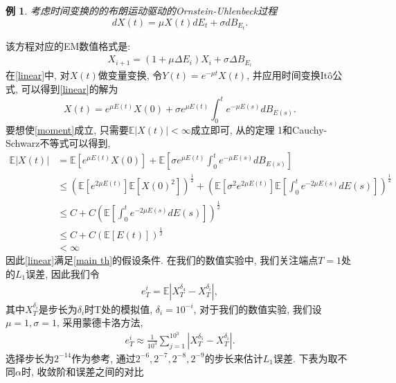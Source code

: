 \documentclass[12pt, final]{article}
\numberwithin{equation}{section}
\numberwithin{figure}{section}
\numberwithin{table}{section}
\theoremstyle{plain}
\theoremstyle{Definition}
\newtheorem{Example}[Theorem]{例}       %
\theoremstyle{Remark}
\begin{document}
	\begin{Example}
		考虑时间变换的的布朗运动驱动的Ornstein-Uhlenbeck过程
			\begin{equation}\label{linear}
			dX(t) = \mu X(t)dE_t + \sigma dB_{E_t}. 
		\end{equation}
	\end{Example}
		该方程对应的EM数值格式是:
		\begin{align*}
			X_{i+1} = (1 + \mu \Delta E_i) X_i + \sigma \Delta B_{E_i}
		\end{align*}
		在\cref{linear}中, 对$X(t)$做变量变换, 令$Y(t) = e^{-\mu t}X(t)$, 并应用时间变换It\^{o}公式, 可以得到\cref{linear}的解为
		\begin{equation}\label{linear solusion}
			X(t) = e^{\mu E(t)}X(0) + \sigma e^{\mu E(t)} \int_{0}^{t}e^{-\mu E(s)}dB_{E(s)}. 
		\end{equation}
		要想使\cref{moment}成立, 只需要$\mathbb{E}|X(t)| < \infty$成立即可, 从\cite{jin2019strong}的定理 1和Cauchy-Schwarz不等式可以得到, 
		\begin{align*}
			\mathbb{E}|X(t)| &= \mathbb{E}\left[e^{\mu E(t)}X(0)\right] + \mathbb{E}\left[\sigma e^{\mu E(t)}\int_0^t e^{-\mu E(s)}dB_{E(s)}\right]\\
			&\le \left(\mathbb{E}\left[e^{2\mu E(t)}\right]\mathbb{E}\left[X(0)^2\right]\right)^{\frac{1}{2}} + \left(\mathbb{E}\left[\sigma^2e^{2\mu E(t)}\right]\mathbb{E}\left[\int_0^te^{-2\mu E(s)}dE(s)\right]\right)^\frac{1}{2}\\
			& \le C + C\left(\mathbb{E}\left[\int_0^te^{-2\mu E(s)}dE(s)\right]\right)^{\frac{1}{2}}\\
			& \le C + C\left(\mathbb{E}[E(t)]\right)^{\frac{1}{2}}\\
			& < \infty
		\end{align*}
		因此\cref{linear}满足\cref{main th}的假设条件. 
		在我们的数值实验中, 我们关注端点$T = 1$处的$L_1$误差, 因此我们令
		\begin{align*}
			e_T^{i}=\mathbb{E}\left|X_T^{\delta _4}-X_T^{\delta _i}\right|, 
		\end{align*}
		其中$X_T^{\delta _i}$是步长为$\delta _i$时T处的模拟值, $\delta _i = 10^{-i}$, 对于我们的数值实验, 我们设$\mu=1, \sigma=1$, 采用蒙德卡洛方法, 
		\begin{align*}
			e_{T}^i\approx\frac{1}{10^3}\sum_{j=1}^{10^3}\left|X_T^{\delta _5}-X_T^{\delta _i}\right|. 
		\end{align*}
		选择步长为$2^{-14}$作为参考, 通过${2^{-6}, 2^{-7}, 2^{-8}, 2^{-9}}$的步长来估计$L_1$误差. 
		下表为取不同$\alpha$时, 收敛阶和误差之间的对比
\end{document}
